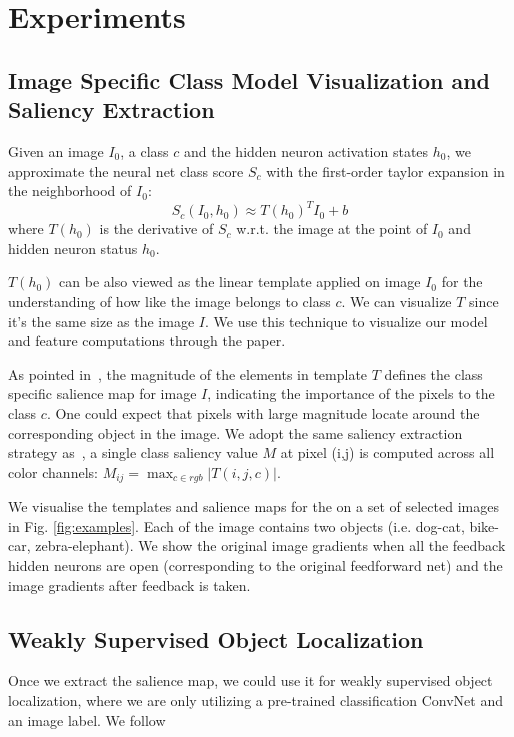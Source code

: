 \section{Experiments}

\subsection{Image Specific Class Model Visualization and Saliency Extraction}
Given an image $I_0$, a class $c$ and the hidden neuron activation states $h_0$, we approximate the neural net class score $S_c$ with the first-order taylor expansion in the neighborhood of $I_0$:
\begin{equation}
  S_c(I_0, h_0) \approx  T(h_0)^T I_0 + b
\end{equation}
where $T(h_0)$ is the derivative of $S_c$ w.r.t. the image at the point of $I_0$ and hidden neuron status $h_0$. 

$T(h_0)$ can be also viewed as the linear template applied on image $I_0$ for the understanding of how like the image belongs to class $c$. We can visualize $T$ since it's the same size as the image $I$. We use this technique to visualize our model and feature computations through the paper. 

As pointed in~\cite{xxx}, the magnitude of the elements in template $T$ defines the class specific salience map for image $I$, indicating the importance of the pixels to the class $c$. One could expect that pixels with large magnitude locate around the corresponding object in the image. We adopt the same saliency extraction strategy as~\cite{xxx}, a single class saliency value $M$ at pixel (i,j) is computed across all color channels: $M_{ij} = \max_{c \in rgb} | T(i,j,c) |$.

We visualise the templates and salience maps for the  on a set of selected images in Fig. \ref{fig:examples}. Each of the image contains two objects (i.e. dog-cat, bike-car, zebra-elephant). We show the original image gradients when all the feedback hidden neurons are open (corresponding to the original feedforward net) and the image gradients after feedback is taken.  

\subsection{Weakly Supervised Object Localization}
Once we extract the salience map, we could use it for weakly supervised object localization, where we are only utilizing a pre-trained classification ConvNet and an image label. We follow~\cite{xxx} 

